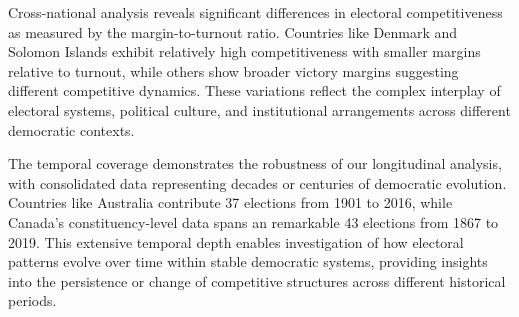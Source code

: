 Cross-national analysis reveals significant differences in electoral competitiveness as measured by the margin-to-turnout ratio. Countries like Denmark and Solomon Islands exhibit relatively high competitiveness with smaller margins relative to turnout, while others show broader victory margins suggesting different competitive dynamics. These variations reflect the complex interplay of electoral systems, political culture, and institutional arrangements across different democratic contexts.

The temporal coverage demonstrates the robustness of our longitudinal analysis, with consolidated data representing decades or centuries of democratic evolution. Countries like Australia contribute 37 elections from 1901 to 2016, while Canada's constituency-level data spans an remarkable 43 elections from 1867 to 2019. This extensive temporal depth enables investigation of how electoral patterns evolve over time within stable democratic systems, providing insights into the persistence or change of competitive structures across different historical periods.
\newpage
